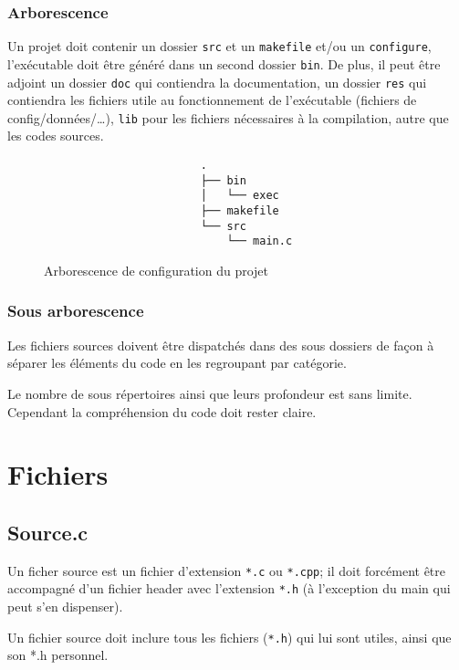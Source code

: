			\subsubsection{Arborescence}
				Un projet doit contenir un dossier \verb+src+ et un \verb+makefile+ et/ou un \verb+configure+, l'exécutable doit être généré dans un second dossier \verb+bin+. De plus, il peut être adjoint un dossier \verb+doc+ qui contiendra la documentation, un dossier \verb+res+ qui contiendra les fichiers utile au fonctionnement de l’exécutable (fichiers de config/données/\dots), \verb+lib+ pour les fichiers nécessaires à la compilation, autre que les codes sources.
				
				\begin{figure}[H]
					\begin{changemargin}{-2.5cm}{-2.5cm}
					\begin{tcolorbox}
					\begin{verbatim}
						.
						├── bin
						│   └── exec
						├── makefile
						└── src
						    └── main.c
					\end{verbatim}
					\end{tcolorbox}
					\end{changemargin}
					\caption{Arborescence de configuration du projet}
				\end{figure}

			\subsubsection{Sous arborescence}
				Les fichiers sources doivent être dispatchés dans des sous dossiers de façon à séparer les éléments du code en les regroupant par catégorie.

				Le nombre de sous répertoires ainsi que leurs profondeur est sans limite. Cependant la compréhension du code doit rester claire.

	\section{Fichiers}
		\subsection{Source.c}
			Un ficher source est un fichier d'extension \verb+*.c+ ou \verb+*.cpp+; il doit forcément être accompagné d'un fichier header avec l'extension \verb+*.h+ (à l'exception du main qui peut s'en dispenser).

			Un fichier source doit inclure tous les fichiers (\verb+*.h+) qui lui sont utiles, ainsi que son *.h personnel.


